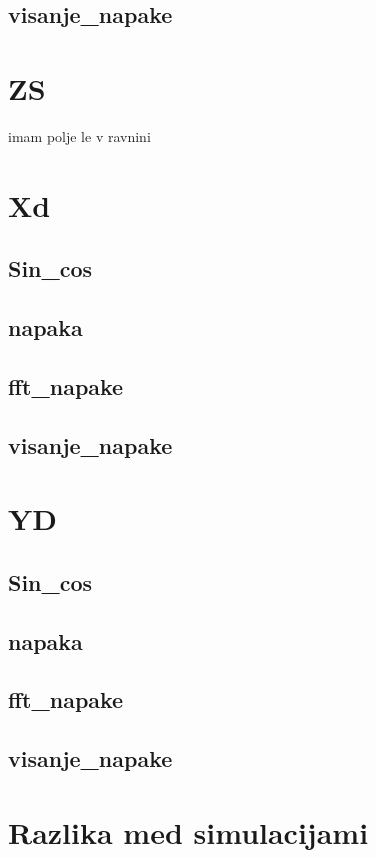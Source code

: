 \subsection{visanje\_napake}

\section{ZS}
imam polje le v ravnini
\section{Xd}
\subsection{Sin\_cos}
\subsection{napaka}
\subsection{fft\_napake}
\subsection{visanje\_napake      }  

\section{YD}
\subsection{Sin\_cos}
\subsection{napaka}
\subsection{fft\_napake}
\subsection{visanje\_napake}


\section{Razlika med simulacijami}